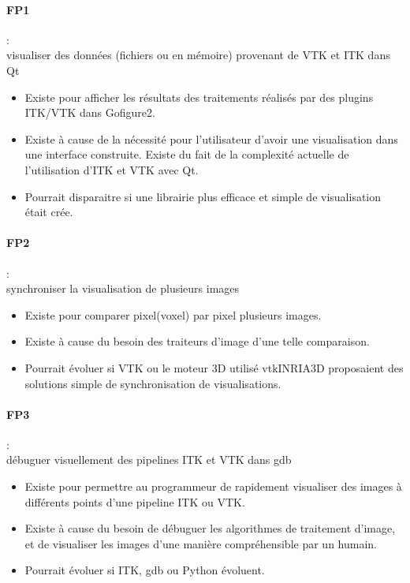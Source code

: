 \paragraph*{FP1} :\\ visualiser des données (fichiers ou en mémoire) provenant de VTK et ITK dans Qt
\begin{itemize}
  \item Existe pour afficher les résultats des traitements réalisés par des plugins ITK/VTK dans Gofigure2.
  \item Existe à cause de la nécessité pour l'utilisateur d'avoir une visualisation dans une interface construite.
  Existe du fait de la complexité actuelle de l'utilisation d'ITK et VTK avec Qt. 
  \item Pourrait disparaitre si une librairie plus efficace et simple de visualisation était crée.
\end{itemize}

\paragraph*{FP2} :\\ synchroniser la visualisation de plusieurs images
\begin{itemize}
  \item Existe pour comparer pixel(voxel) par pixel plusieurs images.
  \item Existe à cause du besoin des traiteurs d'image d'une telle comparaison.
  \item Pourrait évoluer si VTK ou le moteur 3D utilisé vtkINRIA3D\cite{vtkINRIA}
  proposaient des solutions simple de synchronisation de visualisations.
\end{itemize}

\paragraph*{FP3} :\\ débuguer visuellement des pipelines ITK et VTK dans gdb
\begin{itemize}
  \item Existe pour permettre au programmeur de rapidement visualiser des images
   à différents points d'une pipeline ITK ou VTK.
  \item Existe à cause du besoin de débuguer les algorithmes de traitement d'image,
  et de visualiser les images d'une manière compréhensible par un humain.
  \item Pourrait évoluer si ITK, gdb ou Python évoluent.
\end{itemize}

